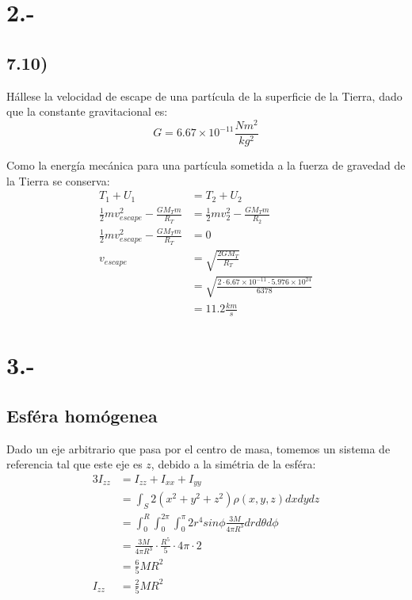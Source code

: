 \documentclass{article}
\begin{document}
\section*{2.-}
\subsection*{7.10)}
Hállese la velocidad de escape de una partícula de la superficie de la Tierra, dado que la constante 
gravitacional es:
\[ G = 6.67 \times 10^{-11} \frac{Nm^2}{kg^2} \]
\begin{tcolorbox}[breakable]
    Como la energía mecánica para una partícula sometida a la fuerza de gravedad de la Tierra se conserva:
    \begin{align*}
        T_1 + U_1 &= T_2 + U_2 \\
        \frac{1}{2}mv_{escape}^2 - \frac{GM_Tm}{R_T} &= \frac{1}{2}mv_{2}^2 - \frac{GM_Tm}{R_2} \\
        \frac{1}{2}mv_{escape}^2 - \frac{GM_Tm}{R_T} &= 0 \\
        v_{escape} 
        &= \sqrt{\frac{2GM_T}{R_T}} \\
        &= \sqrt{\frac{2 \cdot 6.67 \times 10^{-11} \cdot 5.976 \times 10^{24}}{6378}} \\
        &= 11.2\frac{km}{s} 
    \end{align*}
\end{tcolorbox}
\newpage

\section*{3.-}
\subsection*{Esféra homógenea}
\begin{tcolorbox}[breakable]
    Dado un eje arbitrario que pasa por el centro de masa, tomemos un sistema de referencia tal que 
    este eje es $z$, debido a la simétria de la esféra:
    \begin{align*}
        3I_{zz}
        &= I_{zz}+I_{xx}+I_{yy} \\
        &= \int_S 2(x^2+y^2+z^2)\rho(x,y,z) dxdydz\\
        &= \int_{0}^R \int_{0}^{2\pi} \int_{0}^{\pi} 2r^4sin\phi \frac{3M}{4\pi R^3} dr d\theta d\phi \\
        &= \frac{3M}{4\pi R^3} \cdot \frac{R^5}{5} \cdot 4\pi \cdot 2 \\
        &= \frac{6}{5}MR^2 \\
        I_{zz}
        &= \frac{2}{5}MR^2
    \end{align*}
\end{tcolorbox}
\end{document}
